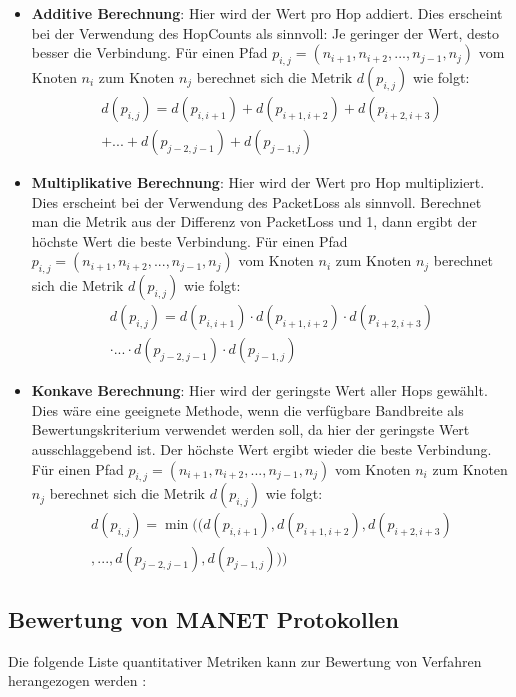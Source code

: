 \begin{itemize}
\item \textbf{Additive Berechnung}: Hier wird der Wert pro Hop addiert. Dies erscheint \zB bei der Verwendung des HopCounts als sinnvoll: Je geringer der Wert, desto besser die Verbindung. Für einen Pfad $p_{i,j}=(n_{i+1},n_{i+2},...,n_{j-1},n_j)$ vom Knoten $n_i$ zum Knoten $n_j$ berechnet sich die Metrik $d(p_{i,j})$ wie folgt:
\begin{eqnarray*} 
d(p_{i,j})=d(p_{i,i+1}) + d(p_{i+1,i+2}) + d(p_{i+2,i+3})\\
 + ... + d(p_{j-2,j-1}) + d(p_{j-1,j})
\end{eqnarray*} 
\item \textbf{Multiplikative Berechnung}: Hier wird der Wert pro Hop multipliziert. Dies erscheint \zB bei der Verwendung des PacketLoss als sinnvoll. Berechnet man die Metrik aus der Differenz von PacketLoss und 1, dann ergibt der höchste Wert die beste Verbindung. Für einen Pfad $p_{i,j}=(n_{i+1},n_{i+2},...,n_{j-1},n_j)$ vom Knoten $n_i$ zum Knoten $n_j$ berechnet sich die Metrik $d(p_{i,j})$ wie folgt:
\begin{eqnarray*} 
d(p_{i,j})=d(p_{i,i+1}) \cdot d(p_{i+1,i+2}) \cdot d(p_{i+2,i+3})\\
 \cdot ... \cdot d(p_{j-2,j-1}) \cdot d(p_{j-1,j})
\end{eqnarray*} 
\item \textbf{Konkave Berechnung}: Hier wird der geringste Wert aller Hops gewählt. Dies wäre eine geeignete Methode, wenn die verfügbare Bandbreite als Bewertungskriterium verwendet werden soll, da hier der geringste Wert ausschlaggebend ist. Der höchste Wert ergibt wieder die beste Verbindung. Für einen Pfad $p_{i,j}=(n_{i+1},n_{i+2},...,n_{j-1},n_j)$ vom Knoten $n_i$ zum Knoten $n_j$ berechnet sich die Metrik $d(p_{i,j})$ wie folgt:
\begin{eqnarray*} 
d(p_{i,j})= \min((d(p_{i,i+1}),d(p_{i+1,i+2}),d(p_{i+2,i+3})\\
 ,...,d(p_{j-2,j-1}),d(p_{j-1,j})))
\end{eqnarray*} 
\end{itemize}

\subsection{Bewertung von MANET Protokollen}
\label{chapter:grundlagen:meshmetriken}

Die folgende Liste quantitativer Metriken kann zur Bewertung von Verfahren herangezogen werden \cite{RFC2501}:

